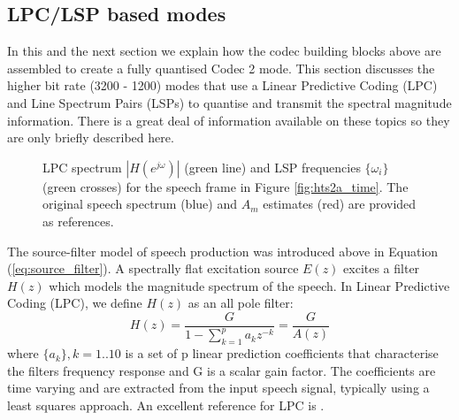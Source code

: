 \documentclass{article}
\begin{document}
\subsection{LPC/LSP based modes}
\label{sect:mode_lpc_lsp}

In this and the next section we explain how the codec building blocks above are assembled to create a fully quantised Codec 2 mode.  This section discusses the higher bit rate (3200 - 1200) modes that use a Linear Predictive Coding (LPC) and Line Spectrum Pairs (LSPs) to quantise and transmit the spectral magnitude information.  There is a great deal of information available on these topics so they are only briefly described here.

\begin{figure} [h]
\caption{LPC spectrum $|H(e^{j \omega})|$ (green line) and LSP frequencies $\{\omega_i\}$ (green crosses) for the speech frame in Figure \ref{fig:hts2a_time}. The original speech spectrum (blue) and $A_m$ estimates (red) are provided as references.}
\label{fig:hts2a_lpc_lsp}
\begin{center}

\end{center}
\end{figure}

The source-filter model of speech production was introduced above in Equation (\ref{eq:source_filter}).  A spectrally flat excitation source $E(z)$ excites a filter $H(z)$ which models the magnitude spectrum of the speech.  In Linear Predictive Coding (LPC), we define $H(z)$ as an all pole filter:
\begin{equation}
H(z) = \frac{G}{1-\sum_{k=1}^p a_k z^{-k}} = \frac{G}{A(z)}
\end{equation}
where  $\{a_k\}, k=1..10$ is a set of p linear prediction coefficients that characterise the filters frequency response and G is a scalar gain factor.  The coefficients are time varying and are extracted from the input speech signal, typically using a least squares approach.  An excellent reference for LPC is \cite{makhoul1975linear}.
\end{document}
